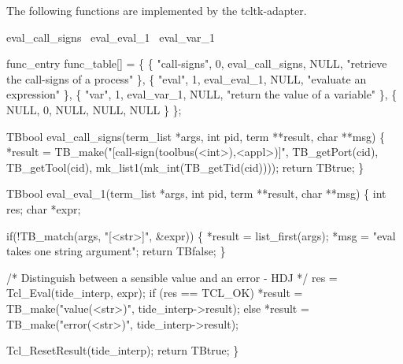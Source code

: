 
The following functions are implemented by the tcltk-adapter.

\nwenddocs{}\endmoddef
\LA{}eval_call_signs~{\nwtagstyle{}}\RA{}
\LA{}eval_eval_1~{\nwtagstyle{}}\RA{}
\LA{}eval_var_1~{\nwtagstyle{}}\RA{}

func_entry func_table[] =
\{ \{ "call-signs", 0, eval_call_signs, NULL, "retrieve the call-signs of a process" \},
  \{ "eval", 1, eval_eval_1, NULL, "evaluate an expression" \},
  \{ "var", 1, eval_var_1, NULL, "return the value of a variable" \},
  \{ NULL, 0, NULL, NULL, NULL \}
\};
\nwendcode{}\nwdocspar

\nwenddocs{}\endmoddef\let\nwnotused=\nwoutput{}
TBbool eval_call_signs(term_list *args, int pid, term **result, char **msg)
\{
  *result = TB_make("[call-sign(toolbus(<int>),<appl>)]", TB_getPort(cid),
                TB_getTool(cid), mk_list1(mk_int(TB_getTid(cid))));
  return TBtrue;  
\}
\nwendcode{}\nwdocspar

\nwenddocs{}\endmoddef\let\nwnotused=\nwoutput{}
TBbool eval_eval_1(term_list *args, int pid, term **result, char **msg)
\{
  int  res;
  char *expr;

  if(!TB_match(args, "[<str>]", &expr)) \{
    *result = list_first(args);
    *msg = "eval takes one string argument";
    return TBfalse;
  \}

  /* Distinguish between a sensible value and an error - HDJ */
  res = Tcl_Eval(tide_interp, expr);
  if (res == TCL_OK)
    *result = TB_make("value(<str>)", tide_interp->result);
  else
        *result = TB_make("error(<str>)", tide_interp->result);

  Tcl_ResetResult(tide_interp);
  return TBtrue;
\}
\nwendcode{}\nwdocspar

